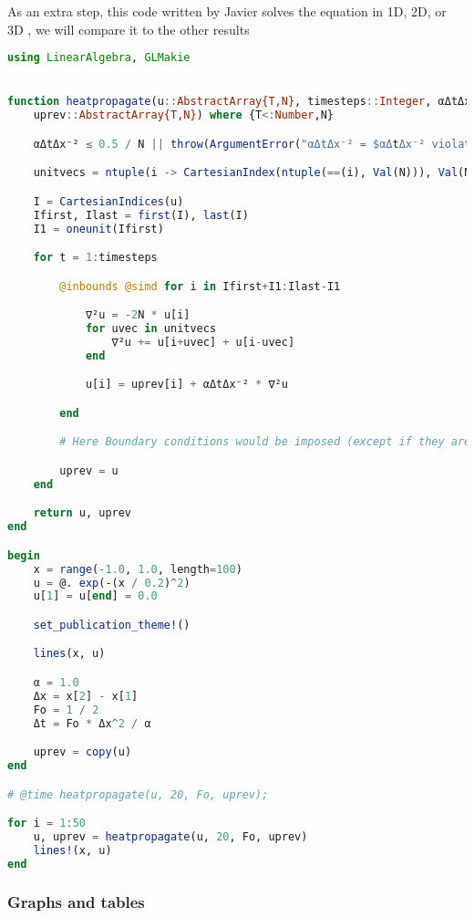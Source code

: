 \clearpage
{}

As an extra step, this code written by Javier solves the equation in 1D, 2D, or 3D , we will compare it to the other results 



\begin{lstlisting}[language=Julia]
using LinearAlgebra, GLMakie


function heatpropagate(u::AbstractArray{T,N}, timesteps::Integer, αΔtΔx⁻²::Real,
    uprev::AbstractArray{T,N}) where {T<:Number,N}

    αΔtΔx⁻² ≤ 0.5 / N || throw(ArgumentError("αΔtΔx⁻² = $αΔtΔx⁻² violates Fourier stability condition"))

    unitvecs = ntuple(i -> CartesianIndex(ntuple(==(i), Val(N))), Val(N))

    I = CartesianIndices(u)
    Ifirst, Ilast = first(I), last(I)
    I1 = oneunit(Ifirst)

    for t = 1:timesteps

        @inbounds @simd for i in Ifirst+I1:Ilast-I1

            ∇²u = -2N * u[i]
            for uvec in unitvecs
                ∇²u += u[i+uvec] + u[i-uvec]
            end

            u[i] = uprev[i] + αΔtΔx⁻² * ∇²u

        end

        # Here Boundary conditions would be imposed (except if they are Dirichlet at boundary)

        uprev = u
    end

    return u, uprev
end

begin
    x = range(-1.0, 1.0, length=100)
    u = @. exp(-(x / 0.2)^2)
    u[1] = u[end] = 0.0

    set_publication_theme!()

    lines(x, u)

    α = 1.0
    Δx = x[2] - x[1]
    Fo = 1 / 2
    Δt = Fo * Δx^2 / α

    uprev = copy(u)
end

# @time heatpropagate(u, 20, Fo, uprev);

for i = 1:50
    u, uprev = heatpropagate(u, 20, Fo, uprev)
    lines!(x, u)
end

\end{lstlisting}



\subsubsection{Graphs and tables}

